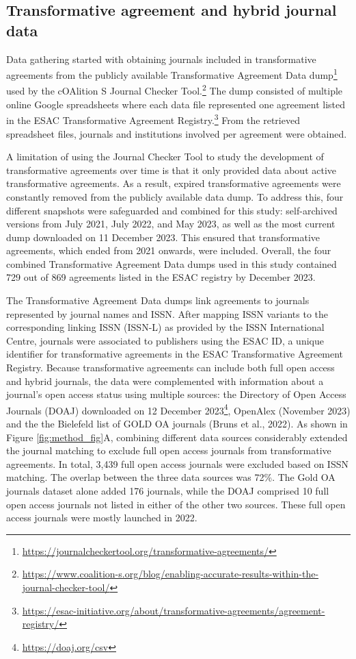\documentclass[a4paper,man,floatsintext,longtable,noextraspace,12pt]{apa6}
\begin{document}
\hypertarget{transformative-agreement-and-hybrid-journal-data}{%
\subsection{Transformative agreement and hybrid journal
data}\label{transformative-agreement-and-hybrid-journal-data}}

Data gathering started with obtaining journals included in
transformative agreements from the publicly available Transformative
Agreement Data dump\footnote{\url{https://journalcheckertool.org/transformative-agreements/}}
used by the cOAlition S Journal Checker Tool.\footnote{\url{https://www.coalition-s.org/blog/enabling-accurate-results-within-the-journal-checker-tool/}}
The dump consisted of multiple online Google spreadsheets where each
data file represented one agreement listed in the ESAC Transformative
Agreement Registry.\footnote{\url{https://esac-initiative.org/about/transformative-agreements/agreement-registry/}}
From the retrieved spreadsheet files, journals and institutions involved
per agreement were obtained.

A limitation of using the Journal Checker Tool to study the development
of transformative agreements over time is that it only provided data
about active transformative agreements. As a result, expired
transformative agreements were constantly removed from the publicly
available data dump. To address this, four different snapshots were
safeguarded and combined for this study: self-archived versions from
July 2021, July 2022, and May 2023, as well as the most current dump
downloaded on 11 December 2023. This ensured that transformative
agreements, which ended from 2021 onwards, were included. Overall, the
four combined Transformative Agreement Data dumps used in this study
contained 729 out of 869 agreements listed in the ESAC registry by
December 2023.

The Transformative Agreement Data dumps link agreements to journals
represented by journal names and ISSN. After mapping ISSN variants to
the corresponding linking ISSN (ISSN-L) as provided by the ISSN
International Centre, journals were associated to publishers using the
ESAC ID, a unique identifier for transformative agreements in the ESAC
Transformative Agreement Registry. Because transformative agreements can
include both full open access and hybrid journals, the data were
complemented with information about a journal's open access status using
multiple sources: the Directory of Open Access Journals (DOAJ)
downloaded on 12 December 2023\footnote{\url{https://doaj.org/csv}},
OpenAlex (November 2023) and the the Bielefeld list of GOLD OA journals
(Bruns et al., 2022). As shown in Figure \ref{fig:method_fig}A,
combining different data sources considerably extended the journal
matching to exclude full open access journals from transformative
agreements. In total, 3,439 full open access journals were excluded
based on ISSN matching. The overlap between the three data sources was
72\%. The Gold OA journals dataset alone added 176 journals, while the
DOAJ comprised 10 full open access journals not listed in either of the
other two sources. These full open access journals were mostly launched
in 2022.
\end{document}
